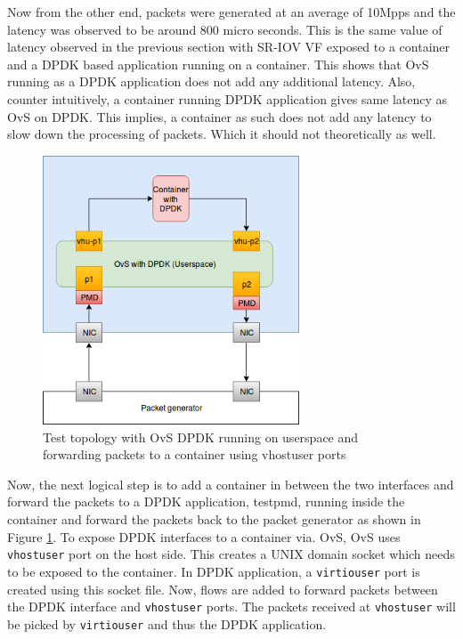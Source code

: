 \documentclass[english, 12pt, a4paper, elec, utf8, a-1b, online]{aaltothesis}
\begin{document}
Now from the other end, packets were generated at an average of 10Mpps and the latency was observed to be around 800 micro seconds. This is the same value of latency observed in the previous section with SR-IOV VF exposed to a container and a DPDK based application running on a container. This shows that OvS running as a DPDK application does not add any additional latency. Also, counter intuitively, a container running DPDK application gives same latency as OvS on DPDK. This implies, a container as such does not add any latency to slow down the processing of packets. Which it should not theoretically as well.

\begin{figure}[htb]
\begin{center}
\includegraphics[height=8cm]{pics/Container-ovs-dpdk.png}
\end{center}
\caption{Test topology with OvS DPDK running on userspace and forwarding packets to a container using vhostuser ports}
\label{fig-test-ovs-dpdk}
\end{figure}

Now, the next logical step is to add a container in between the two interfaces and forward the packets to a DPDK application, testpmd, running inside the container and forward the packets back to the packet generator as shown in Figure \ref{fig-test-ovs-dpdk}. To expose DPDK interfaces to a container via. OvS, OvS uses \lstinline{vhostuser} port on the host side. This creates a UNIX domain socket which needs to be exposed to the container. In DPDK application, a \lstinline{virtiouser} port is created using this socket file. Now, flows are added to forward packets between the DPDK interface and \lstinline{vhostuser} ports. The packets received at \lstinline{vhostuser} will be picked by \lstinline{virtiouser} and thus the DPDK application.
\end{document}
